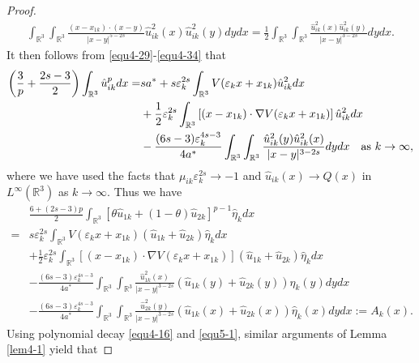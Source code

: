 \documentclass[reqno, 11pt]{amsart} %
\numberwithin{equation}{section}
\begin{document}
\begin{proof}
		\begin{align*} 
			\int_{\mathbb{R}^{3}}\int_{\mathbb{R}^{3}}\frac{(x-x_{1k})\cdot(x-y)}{|x-y|^{5-2s}}\hat{u}^{2}_{ik}(x)\hat{u}^{2}_{ik}(y)dydx
			=\frac{1}{2}\int_{\mathbb{R}^{3}}\int_{\mathbb{R}^{3}}\frac{\hat{u}^{2}_{ik}(x)\hat{u}^{2}_{ik}(y)}{|x-y|^{3-2s}}dydx.
		\end{align*}
		It then follows from \eqref{equ4-29}-\eqref{equ4-34} that
		\begin{align*} 
			\left( \frac{3}{p}+\frac{2s-3}{2}\right) \int_{\mathbb{R}^{3}}\hat{u}_{ik}^{p}dx=&sa^{\ast}+s\varepsilon_{k}^{2s}\int_{\mathbb{R}^{3}}V(\varepsilon_{k}x+x_{1k})\hat{u}_{ik}^{2}dx\\
			&+\frac{1}{2}\varepsilon_{k}^{2s}\int_{\mathbb{R}^{3}}\left[ (x-x_{1k})\cdot \nabla V(\varepsilon_{k}x+x_{1k})\right] \hat{u}_{ik}^{2}dx\\
			&-\frac{(6s-3)\varepsilon_{k}^{4s-3}}{4a^{\ast}}\int_{\mathbb{R}^{3}}\int_{\mathbb{R}^{3}}\frac{\hat{u}_{ik}^{2}(y)\hat{u}_{ik}^{2}(x)}{|x-y|^{3-2s}}dydx \quad \hbox{as $k\rightarrow\infty$},
		\end{align*}
		where we have used the facts that $\mu_{ik}\varepsilon^{2s}_{k}\rightarrow-1$ and $\hat{u}_{ik}(x)\rightarrow Q(x)$ in $L^{\infty}(\mathbb{R}^{3})$
		as $k\rightarrow\infty$. Thus we have
		\begin{equation*}
			\begin{split}
				&\frac{6+(2s-3)p}{2}\int_{\mathbb{R}^{3}}\left[\theta \hat{u}_{1k}+(1-\theta)\hat{u}_{2k}\right]^{p-1}\hat{\eta}_{k}dx\\
				=&s\varepsilon_{k}^{2s}\int_{\mathbb{R}^{3}}V(\varepsilon_{k}x+x_{1k})(\hat{u}_{1k}+\hat{u}_{2k})\hat{\eta}_{k}dx\\
				&+\frac{1}{2}\varepsilon_{k}^{2s}\int_{\mathbb{R}^{3}}\left[ (x-x_{1k})\cdot \nabla V(\varepsilon_{k}x+x_{1k})\right](\hat{u}_{1k}+\hat{u}_{2k})\hat{\eta}_{k}dx\\
				&-\frac{(6s-3)\varepsilon_{k}^{4s-3}}{4a^{\ast}}\int_{\mathbb{R}^{3}}\int_{\mathbb{R}^{3}}\frac{\hat{u}_{1k}^{2}(x)}{|x-y|^{3-2s}}(\hat{u}_{1k}(y)+\hat{u}_{2k}(y))\hat{\eta}_{k}(y)dydx\\
				&-\frac{(6s-3)\varepsilon_{k}^{4s-3}}{4a^{\ast}}\int_{\mathbb{R}^{3}}\int_{\mathbb{R}^{3}}\frac{\hat{u}_{2k}^{2}(y)}{|x-y|^{3-2s}}(\hat{u}_{1k}(x)+\hat{u}_{2k}(x))\hat{\eta}_{k}(x)dydx:=A_{k}(x).
			\end{split}
		\end{equation*}
		Using polynomial decay \eqref{equ4-16} and \eqref{equ5-1}, similar arguments of Lemma \ref{lem4-1} yield that

\end{proof}
\end{document}
